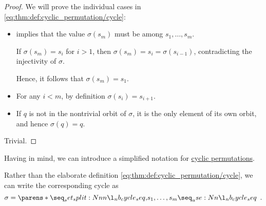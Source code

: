 \begin{proof}
   We will prove the individual cases in \eqref{eq:thm:def:cyclic_permutation/cycle}:
  \begin{itemize}
    \item {} implies that the value \( \sigma(s_m) \) must be among \( s_1, \ldots, s_m \).

    If \( \sigma(s_m) = s_i \) for \( i > 1 \), then \( \sigma(s_m) = s_i = \sigma(s_{i-1}) \), contradicting the injectivity of \( \sigma \).

    Hence, it follows that \( \sigma(s_m) = s_1 \).

    \item For any \( i < m \), by definition \( \sigma(s_i) = s_{i + 1} \).

    \item If \( q \) is not in the nontrivial orbit of \( \sigma \), it is the only element of its own orbit, and hence \( \sigma(q) = q \).
  \end{itemize}

   Trivial.
\end{proof}

\begin{remark}\label{rem:cycle_notation}
  Having  in mind, we can introduce a simplified notation for \hyperref[def:cyclic_permutation]{cyclic permutations}.

  Rather than the elaborate definition \eqref{eq:thm:def:cyclic_permutation/cycle}, we can write the corresponding cycle as
  \begin{equation*}
    \sigma = \cycle{ s_1, \ldots, s_m }.
  \end{equation*}
\end{remark}

